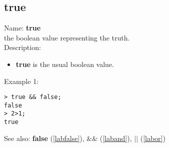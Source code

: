 \subsection{true}
\label{labtrue}
\noindent Name: \textbf{true}\\
the boolean value representing the truth.\\
\noindent Description: \begin{itemize}

\item \textbf{true} is the usual boolean value.
\end{itemize}
\noindent Example 1: 
\begin{center}\begin{minipage}{15cm}\begin{Verbatim}[frame=single]
> true && false;
false
> 2>1;
true
\end{Verbatim}
\end{minipage}\end{center}
See also: \textbf{false} (\ref{labfalse}), \textbf{$\&\&$} (\ref{laband}), \textbf{$||$} (\ref{labor})
